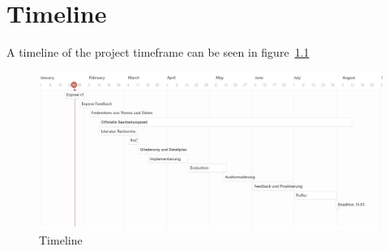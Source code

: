 \chapter{Timeline}
A timeline of the project timeframe can be seen in figure~\ref{fig:timeline}
\begin{figure}[t]
    \centering
    \includegraphics[width=\linewidth]{images/timeline}
    \caption{Timeline}\label{fig:timeline}
\end{figure}%
